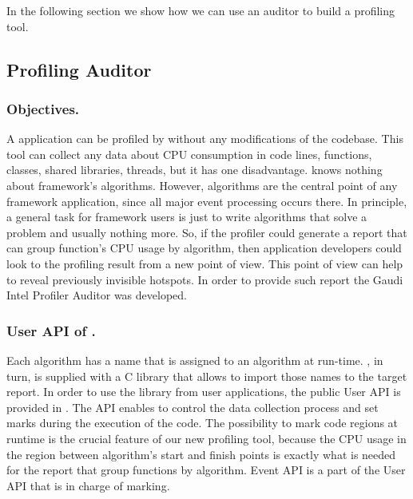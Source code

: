 In the following section we show how we can use an auditor to build a profiling
tool.

\subsection{Profiling Auditor}

\subsubsection{Objectives.}

A \gaudi application can be profiled by \amp  without any modifications of the
codebase.  This tool can collect any data about CPU consumption in code lines,
functions, classes, shared libraries, threads, but it has one disadvantage.
\amp knows nothing about \gaudi framework's algorithms. However, algorithms are
the central point of any framework application, since all major event processing
occurs there. In principle, a general task for framework users is just to write
algorithms that solve a problem and usually nothing more. So, if the profiler
could generate a report that can group function's CPU usage by algorithm, then
application developers could look to the profiling result from a new point of
view. This point of view can help to reveal previously invisible hotspots. In
order to provide such report the Gaudi Intel Profiler Auditor was developed.

\subsubsection{User API of \iamp.}

Each \gaudi algorithm has a name that is assigned to an algorithm at run-time.
\amp, in turn, is supplied with a C library that allows to import those names
to the target report. In order to use the library from user applications, the
public User API is provided in \amp. The API enables to control the data
collection process and set marks during the execution of the code. The
possibility to mark code regions at runtime is the crucial feature of our new
profiling tool, because the CPU usage in the region between algorithm's start and
finish points is exactly what is needed for the report that group functions by algorithm.
Event API is a part of the User API  that is in charge of marking.

